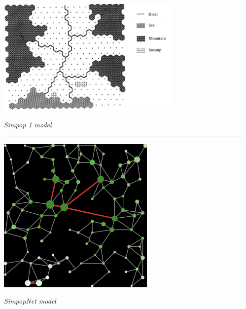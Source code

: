 \documentclass[english,11pt]{beamer}
\begin{document}
{\begin{columns}
\begin{column}{0.5\textwidth}
	\end{column}
	\vrule{}
	\begin{column}{0.5\textwidth}
	\centering
	
	\includegraphics[width=0.7\textwidth]{figures/simpop1.png}
	
	\footnotesize
\textit{Simpop 1 model \cite{sanders1997simpop}}

	\medskip

	\hrule
	
	\medskip

	\includegraphics[width=0.6\textwidth]{figures/setup_synth_1_tick100.png}
	
	\footnotesize
	\textit{SimpopNet model \cite{schmitt2014modelisation}}
	
	\end{column}


\end{columns}

}
\end{document}
